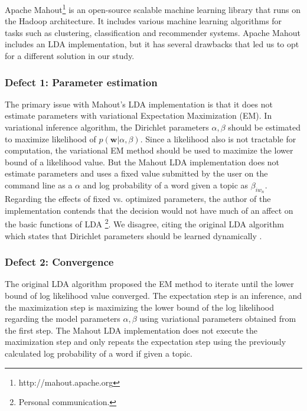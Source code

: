 \documentclass{sig-alternate}
\begin{document}
Apache Mahout\footnote{http://mahout.apache.org} is an open-source scalable machine learning library that runs on the Hadoop architecture. It includes various machine learning algorithms for tasks such as clustering, classification and recommender systems. Apache Mahout includes an LDA implementation, but it has several drawbacks that led us to opt for a different solution in our study.

\subsubsection{Defect 1: Parameter estimation}
The primary issue with Mahout's LDA implementation is that it does not estimate parameters with variational Expectation Maximization (EM). In variational inference algorithm, the Dirichlet parameters $\alpha, \beta$ should be estimated to maximize likelihood of $p(\mathbf{w}|\alpha,\beta)$. Since a likelihood also is not tractable for computation, the variational EM method should be used to maximize the lower bound of a likelihood value. But the Mahout LDA implementation does not estimate parameters and uses a fixed value submitted by the user on the command line as a $\alpha$ and log probability of a word given a topic as $\beta_{iw_n}$. Regarding the effects of fixed vs. optimized parameters, the author of the implementation contends that the decision would not have much of an affect on the basic functions of LDA \footnote{Personal communication.}. We disagree, citing the original LDA algorithm which states that Dirichlet parameters should be learned dynamically \cite{Blei2003a}.

\subsubsection{Defect 2: Convergence}
The original LDA algorithm proposed the EM method to iterate until the lower bound of log likelihood value converged. The expectation step is an inference, and the maximization step is maximizing the lower bound of the log likelihood regarding the model parameters $\alpha, \beta$ using variational parameters obtained from the first step. The Mahout LDA implementation does not execute the maximization step and only repeats the expectation step using the previously calculated log probability of a word if given a topic.
\end{document}
